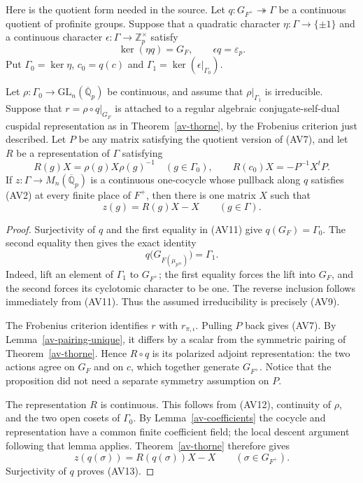 Here is the quotient form needed in the source. Let
$q:G_{F^+}\twoheadrightarrow\Gamma$ be a continuous quotient
of profinite groups. Suppose that a quadratic character
$\eta:\Gamma\longrightarrow\{\pm1\}$ and a continuous
character $\epsilon:\Gamma\longrightarrow\mathbb Z_p^\times$
satisfy
\[
 \ker(\eta q)=G_F,\qquad
 \epsilon q=\varepsilon_p.
                                                               \tag{AV11}
\]
Put $\Gamma_0=\ker\eta$, $c_0=q(c)$ and
$\Gamma_1=\ker(\epsilon|_{\Gamma_0})$.

\begin{proposition}\label{av-quotient}
Let $\rho:\Gamma_0\longrightarrow
\mathrm{GL}_n(\overline{\mathbb Q}_p)$ be continuous, and
assume that $\rho|_{\Gamma_1}$ is irreducible. Suppose that
$r=\rho\circ q|_{G_F}$ is attached to a regular algebraic
conjugate-self-dual cuspidal representation as in
Theorem~\ref{av-thorne}, by the Frobenius criterion just
described. Let $P$ be any matrix satisfying the quotient
version of (AV7), and let $R$ be a representation of
$\Gamma$ satisfying
\[
 R(g)X=\rho(g)X\rho(g)^{-1}\quad(g\in\Gamma_0),\qquad
 R(c_0)X=-P^{-1}X^tP.                                          \tag{AV12}
\]
If $z:\Gamma\longrightarrow M_n(\overline{\mathbb Q}_p)$
is a continuous one-cocycle whose pullback along $q$
satisfies (AV2) at every finite place of $F^+$, then there is
one matrix $X$ such that
\[
                          z(g)=R(g)X-X\qquad(g\in\Gamma).
                                                               \tag{AV13}
\]
\end{proposition}
\begin{proof}
Surjectivity of $q$ and the first equality in (AV11) give
$q(G_F)=\Gamma_0$. The second equality then gives the exact
identity
\[
          q\bigl(G_{F(\mu_{p^\infty})}\bigr)=\Gamma_1.
                                                               \tag{AV14}
\]
Indeed, lift an element of $\Gamma_1$ to $G_{F^+}$;
the first equality forces the lift into $G_F$, and the
second forces its cyclotomic character to be one. The
reverse inclusion follows immediately from (AV11).
Thus the assumed irreducibility is precisely (AV9).

The Frobenius criterion identifies $r$ with $r_{\pi,\iota}$.
Pulling $P$ back gives (AV7). By
Lemma~\ref{av-pairing-unique}, it differs by a scalar from
the symmetric pairing of Theorem~\ref{av-thorne}. Hence
$R\circ q$ is its polarized adjoint representation: the
two actions agree on $G_F$ and on $c$, which together
generate $G_{F^+}$. Notice that the proposition did not
need a separate symmetry assumption on $P$.

The representation $R$ is continuous. This follows from
(AV12), continuity of $\rho$, and the two open cosets of
$\Gamma_0$. By Lemma~\ref{av-coefficients} the cocycle
and representation have a common finite coefficient field;
the local descent argument following that lemma applies.
Theorem~\ref{av-thorne} therefore gives
\[
                         z(q(\sigma))=R(q(\sigma))X-X
                         \qquad(\sigma\in G_{F^+}).
\]
Surjectivity of $q$ proves (AV13).
\end{proof}

